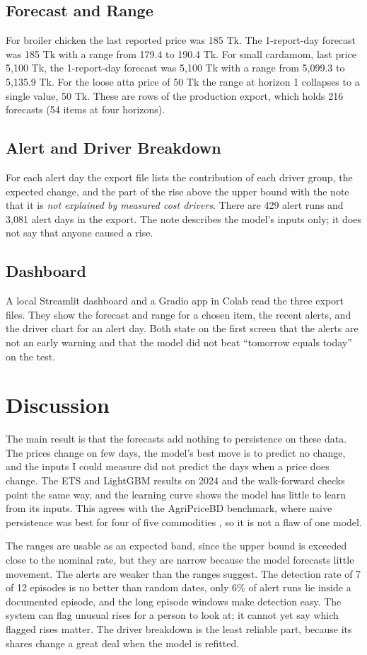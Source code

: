 \documentclass[12pt]{report}
\newcommand{\unexpl}{\emph{not explained by measured cost drivers}}
\begin{document}
\subsection{Forecast and Range}
For broiler chicken the last reported price was 185 Tk. The 1-report-day forecast was 185 Tk with a range from 179.4 to 190.4 Tk. For small cardamom, last price 5,100 Tk, the 1-report-day forecast was 5,100 Tk with a range from 5,099.3 to 5,135.9 Tk. For the loose atta price of 50 Tk the range at horizon 1 collapses to a single value, 50 Tk. These are rows of the production export, which holds 216 forecasts (54 items at four horizons).

\subsection{Alert and Driver Breakdown}
For each alert day the export file lists the contribution of each driver group, the expected change, and the part of the rise above the upper bound with the note that it is \unexpl. There are 429 alert runs and 3,081 alert days in the export. The note describes the model's inputs only; it does not say that anyone caused a rise.

\subsection{Dashboard}
A local Streamlit dashboard and a Gradio app in Colab read the three export files. They show the forecast and range for a chosen item, the recent alerts, and the driver chart for an alert day. Both state on the first screen that the alerts are not an early warning and that the model did not beat ``tomorrow equals today'' on the test.

\section{Discussion}
The main result is that the forecasts add nothing to persistence on these data. The prices change on few days, the model's best move is to predict no change, and the inputs I could measure did not predict the days when a price does change. The ETS and LightGBM results on 2024 and the walk-forward checks point the same way, and the learning curve shows the model has little to learn from its inputs. This agrees with the AgriPriceBD benchmark, where naive persistence was best for four of five commodities \cite{agripricebd}, so it is not a flaw of one model.

The ranges are usable as an expected band, since the upper bound is exceeded close to the nominal rate, but they are narrow because the model forecasts little movement. The alerts are weaker than the ranges suggest. The detection rate of 7 of 12 episodes is no better than random dates, only 6\% of alert runs lie inside a documented episode, and the long episode windows make detection easy. The system can flag unusual rises for a person to look at; it cannot yet say which flagged rises matter. The driver breakdown is the least reliable part, because its shares change a great deal when the model is refitted.
\end{document}
